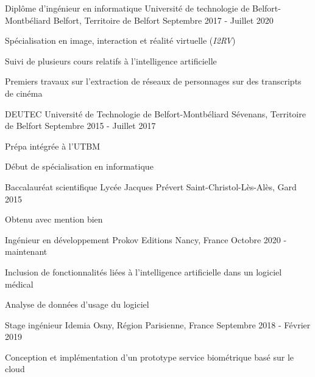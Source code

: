 \documentclass[12pt, a4paper]{awesome-cv}
\begin{document}
\begin{cventries}
  \cventry
  {Diplôme d'ingénieur en informatique}
  {Université de technologie de Belfort-Montbéliard}
  {Belfort, Territoire de Belfort}
  {Septembre 2017 - Juillet 2020}
  {
    \begin{cvitems}
      \item Spécialisation en image, interaction et réalité virtuelle (\textit{I2RV})
      \item Suivi de plusieurs cours relatifs à l'intelligence artificielle
      \item Premiers travaux sur l'extraction de réseaux de personnages sur des transcripts de cinéma
    \end{cvitems}
  }

  \cventry
  {DEUTEC}
  {Université de Technologie de Belfort-Montbéliard}
  {Sévenans, Territoire de Belfort}
  {Septembre 2015 - Juillet 2017}
  {
    \begin{cvitems}
      \item Prépa intégrée à l'UTBM
      \item Début de spécialisation en informatique
    \end{cvitems}
  }

  \cventry
  {Baccalauréat scientifique}
  {Lycée Jacques Prévert}
  {Saint-Christol-Lès-Alès, Gard}
  {2015}
  {
    \begin{cvitems}
      \item Obtenu avec mention bien
    \end{cvitems}
  }

  
\end{cventries}



\begin{cventries}

  \cventry
  {Ingénieur en développement}
  {Prokov Editions}
  {Nancy, France}
  {Octobre 2020 - maintenant}
  {
    \begin{cvitems}
      \item Inclusion de fonctionnalités liées à l'intelligence artificielle dans un logiciel médical
      \item Analyse de données d'usage du logiciel
    \end{cvitems}
  }

  \cventry
  {Stage ingénieur}
  {Idemia}
  {Osny, Région Parisienne, France}
  {Septembre 2018 - Février 2019}
  {
    \begin{cvitems}
      \item Conception et implémentation d'un prototype service biométrique basé sur le cloud
    \end{cvitems}
  }

\end{cventries}
\end{document}

